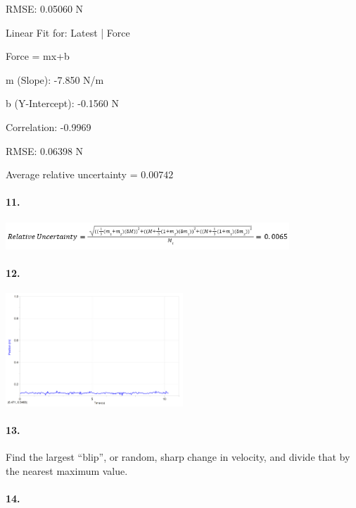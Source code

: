     RMSE: 0.05060 N

    Linear Fit for: Latest | Force 
    
    Force = mx+b

    m (Slope): -7.850 N/m

    b (Y-Intercept): -0.1560 N

    Correlation: -0.9969

    RMSE: 0.06398 N

    Average relative uncertainty = $\boxed{0.00742}$

    \pagebreak

    \paragraph*{11.}

    \begin{center}
        \includegraphics[width=0.8\textwidth]{image50.png}
    \end{center}

    \paragraph*{12.}

    \begin{center}
        \includegraphics[width=0.5\textwidth]{image19.png}
    \end{center}

    \paragraph*{13.}

    Find the largest ``blip'', or random, sharp change in velocity, and divide that by the nearest maximum value.

    \paragraph*{14.}

